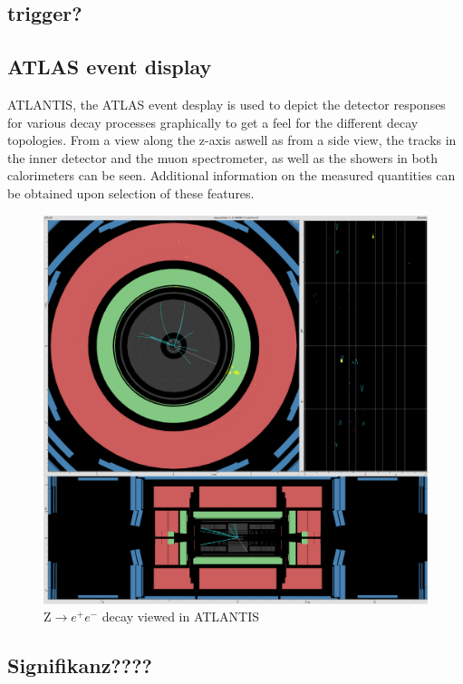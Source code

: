 \documentclass[twoside,        %
               BCOR12mm,       %
               ngerman,english, %
               fleqn,headsepline=false,footsepline=false
              ]{Vorlage/MFPREPORT}
\begin{document}
\subsection{trigger?}

\subsection{ATLAS event display}
ATLANTIS, the ATLAS event desplay is used to depict the detector responses for
various decay processes graphically to get a feel for the different decay
topologies. From a view along the z-axis aswell as from a side view, the tracks
in the inner detector and the muon spectrometer, as well as the showers in both
calorimeters can be seen. Additional information on the measured quantities can
be obtained upon selection of these features.
\begin{figure}[]
    \centering
        \includegraphics[width=\textwidth]{fig/Zee}
    \caption{Z$\rightarrow e^+e^-$ decay viewed in ATLANTIS}
    \label{fig:atlantis}
\end{figure}


\subsection{Signifikanz????}
\cite{signifikanz}
\end{document}

